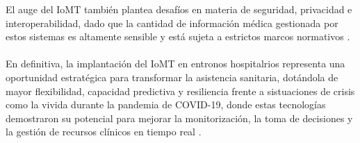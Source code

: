 El auge del \acs{IoMT} también plantea desafíos en materia de seguridad, privacidad e interoperabilidad, dado que la cantidad de información médica gestionada por estos sistemas es altamente 
sensible y está sujeta a estrictos marcos normativos \cite{articulo3}. \\ \\

En definitiva, la implantación del \acs{IoMT} en entronos hospitalrios representa una oportunidad estratégica para transformar la asistencia sanitaria, dotándola de mayor flexibilidad, 
capacidad predictiva y resiliencia frente a sistuaciones de crisis como la vivida durante la pandemia de COVID-19, donde estas tecnologías demostraron su potencial para mejorar la 
monitorización, la toma de decisiones y la gestión de recursos clínicos en tiempo real \cite{articulo3}.
